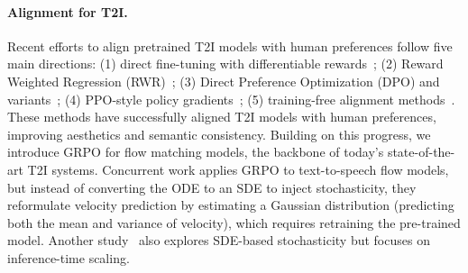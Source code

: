 \paragraph{Alignment for T2I.}
Recent efforts to align pretrained T2I models with human preferences follow five main directions:
(1) direct fine-tuning with differentiable rewards~\cite{prabhudesai2023aligning, clark2023directly, xu2024imagereward, prabhudesai2024video};
(2) Reward Weighted Regression (RWR)~\cite{peng2019advantage, fan2025online, lee2023aligning,dong2023raft};
(3) Direct Preference Optimization (DPO) and variants~\cite{rafailov2024direct, wallace2024diffusion, videoalign, yang2024using, liang2024step, yuan2024self, liu2024videodpo, zhang2024onlinevpo, furuta2024improving,liang2025aesthetic};
(4) PPO-style policy gradients~\cite{schulman2017proximal, black2023training, fan2024reinforcement, gupta2025simple, miao2024training, zhao2025score};
(5) training-free alignment methods~\cite{yeh2024training, tang2024tuning, song2023loss}.
These methods have successfully aligned T2I models with human preferences, improving aesthetics and semantic consistency. Building on this progress, we introduce GRPO for flow matching models, the backbone of today's state-of-the-art T2I systems.
Concurrent work \cite{sun2025f5r} applies GRPO to text-to-speech flow models, but instead of converting the ODE to an SDE to inject stochasticity, they reformulate velocity prediction by estimating a Gaussian distribution (predicting both the mean and variance of
velocity), which requires retraining the pre-trained model. Another study~\cite{kim2025inference} also explores SDE-based stochasticity but focuses on inference-time scaling.



